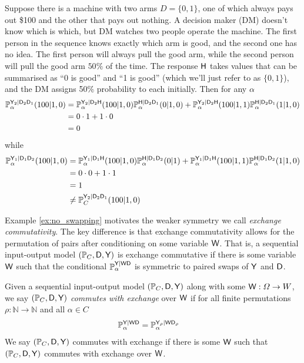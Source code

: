 \begin{example}\label{ex:no_swapping}
Suppose there is a machine with two arms $D=\{0,1\}$, one of which always pays out \$100 and the other that pays out nothing. A decision maker (DM) doesn't know which is which, but DM watches two people operate the machine. The first person in the sequence knows exactly which arm is good, and the second one has no idea. The first person will always pull the good arm, while the second person will pull the good arm $50\%$ of the time. The response $\mathsf{H}$ takes values that can be summarised as ``0 is good'' and ``1 is good'' (which we'll just refer to as $\{0,1\}$), and the DM assigns 50\% probability to each initially. Then for any $\alpha$
\begin{align}
    \mathbb{P}_\alpha^{\mathsf{Y}_2|\mathsf{D}_2\mathsf{D}_1}(100|1, 0) &= \mathbb{P}_\alpha^{\mathsf{Y}_2|\mathsf{D}_2\mathsf{H}}(100|1,0)\mathbb{P}_\alpha^{\mathsf{H}|\mathsf{D}_2\mathsf{D}_1}(0|1,0) + \mathbb{P}_\alpha^{\mathsf{Y}_2|\mathsf{D}_2\mathsf{H}}(100|1,1)\mathbb{P}_\alpha^{\mathsf{H}|\mathsf{D}_2\mathsf{D}_1}(1|1, 0)\\
    &= 0\cdot 1 + 1\cdot 0\\
    &= 0
\end{align}
while
\begin{align}
    \mathbb{P}_\alpha^{\mathsf{Y}_1|\mathsf{D}_1\mathsf{D}_2}(100|1,0) &= \mathbb{P}_\alpha^{\mathsf{Y}_1|\mathsf{D}_1\mathsf{H}}(100|1,0)\mathbb{P}_\alpha^{\mathsf{H}|\mathsf{D}_1\mathsf{D}_2}(0|1) + \mathbb{P}_\alpha^{\mathsf{Y}_1|\mathsf{D}_1\mathsf{H}}(100|1,1)\mathbb{P}_\alpha^{\mathsf{H}|\mathsf{D}_1\mathsf{D}_2}(1|1,0)\\
    &= 0\cdot0 + 1\cdot 1\\
    &= 1\\
    &\neq \mathbb{P}_C^{\mathsf{Y}_2|\mathsf{D}_2\mathsf{D}_1}(100|1,0)
\end{align}
\end{example}

Example \ref{ex:no_swapping} motivates the weaker symmetry we call \emph{exchange commutativity}. The key difference is that exchange commutativity allows for the permutation of pairs after conditioning on some variable $\mathsf{W}$. That is, a sequential input-output model $(\mathbb{P}_C,\mathsf{D},\mathsf{Y})$ is exchange commutative if there is some variable $\mathsf{W}$ such that the conditional $\mathbb{P}_\alpha^{\mathsf{Y}|\mathsf{WD}}$ is symmetric to paired swaps of $\mathsf{Y}$ and $\mathsf{D}$.

\begin{definition}\label{def:caus_exch}
Given a sequential input-output model $(\mathbb{P}_C,\mathsf{D},\mathsf{Y})$ along with some $\mathsf{W}:\Omega\to W$, we say $(\mathbb{P}_C,\mathsf{D},\mathsf{Y})$ \emph{commutes with exchange} over $\mathsf{W}$ if for all finite permutations $\rho:\mathbb{N}\to\mathbb{N}$ and all $\alpha\in C$
\begin{align}
    \mathbb{P}_\alpha^{\mathsf{Y}|\mathsf{WD}} &=  \mathbb{P}_\alpha^{\mathsf{Y}_\rho|\mathsf{WD}_\rho}
\end{align}
We say $(\mathbb{P}_C,\mathsf{D},\mathsf{Y})$ commutes with exchange if there is some $\mathsf{W}$ such that $(\mathbb{P}_C,\mathsf{D},\mathsf{Y})$ commutes with exchange over $\mathsf{W}$.   
\end{definition}

